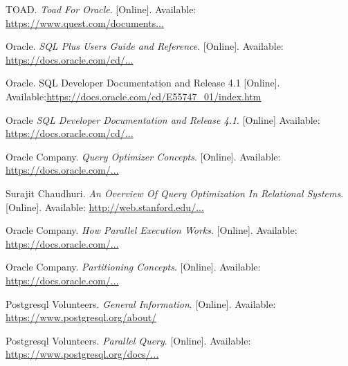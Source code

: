 \documentclass[draftclsnofoot, onecolumn, compsoc, 10pt]{IEEEtran}
\begin{document}

\begin{thebibliography}{9}
TOAD.
\textit{Toad For Oracle}.
[Online].
Available: \href{https://www.quest.com/documents/toad-for-oracle-datasheet-67887.pdf}{https://www.quest.com/documents...}

Oracle.
\textit{SQL Plus Users Guide and Reference}.
[Online].
Available: \href{https://docs.oracle.com/cd/B19306_01/server.102/b14357/qstart.htm#i1056581}{https://docs.oracle.com/cd/...}

Oracle.
{SQL Developer Documentation and Release 4.1}
[Online].
Available:\url{https://docs.oracle.com/cd/E55747_01/index.htm}


Oracle
\textit{SQL Developer Documentation and Release 4.1}.
[Online]
Available: \href{https://docs.oracle.com/cd/E55747_01/index.htm}{https://docs.oracle.com/cd/...}

Oracle Company.
\textit{Query Optimizer Concepts}.
[Online].
Available: \href{https://docs.oracle.com/database/121/TGSQL/tgsql_optcncpt.htm#TGSQL192}{https://docs.oracle.com/...}
 
Surajit Chaudhuri.
\textit{An Overview Of Query Optimization In Relational Systems}.
[Online].
Available: \href{http://web.stanford.edu/class/cs345d-01/rl/chaudhuri98.pdf}{http://web.stanford.edu/...}

Oracle Company.
\textit{How Parallel Execution Works}.
[Online].
Available: \href{https://docs.oracle.com/cd/E11882_01/server.112/e25523/parallel002.htm}{https://docs.oracle.com/...}

Oracle Company.
\textit{Partitioning Concepts}.
[Online].
Available: \href{https://docs.oracle.com/cd/B28359_01/server.111/b32024/partition.htm}{https://docs.oracle.com/...}

Postgresql Volunteers.
\textit{General Information}.
[Online].
Available: \href{https://www.postgresql.org/about/}{https://www.postgresql.org/about/}

Postgresql Volunteers.
\textit{Parallel Query}.
[Online].
Available: \href{https://www.postgresql.org/docs/current/static/parallel-query.html}{https://www.postgresql.org/docs/...}


\end{thebibliography}
\end{document}

